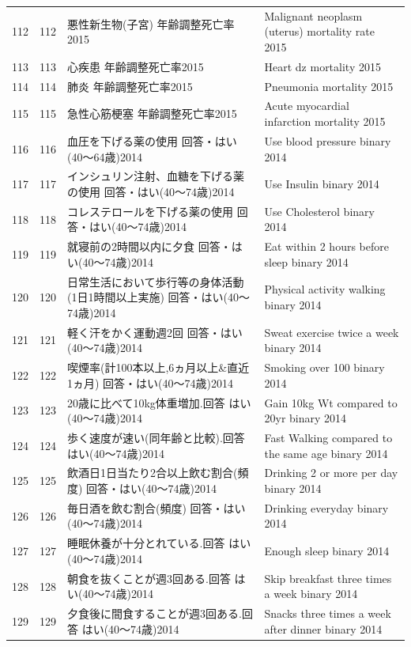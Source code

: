 \begin{table}[ht]
\begin{tabular}{rrll}
  112 & 112 & 悪性新生物(子宮) 年齢調整死亡率2015 & Malignant neoplasm (uterus) mortality rate 2015 \\ 
  113 & 113 & 心疾患 年齢調整死亡率2015 & Heart dz mortality 2015 \\ 
  114 & 114 & 肺炎 年齢調整死亡率2015 & Pneumonia mortality 2015 \\ 
  115 & 115 & 急性心筋梗塞 年齢調整死亡率2015 & Acute myocardial infarction mortality 2015 \\ 
  116 & 116 & 血圧を下げる薬の使用 回答・はい(40〜64歳)2014 & Use blood pressure binary 2014 \\ 
  117 & 117 & インシュリン注射、血糖を下げる薬の使用 回答・はい(40〜74歳)2014 & Use Insulin binary 2014 \\ 
  118 & 118 & コレステロールを下げる薬の使用 回答・はい(40〜74歳)2014 & Use Cholesterol binary 2014 \\ 
  119 & 119 & 就寝前の2時間以内に夕食 回答・はい(40〜74歳)2014 & Eat within 2 hours before sleep binary 2014 \\ 
  120 & 120 & 日常生活において歩行等の身体活動(1日1時間以上実施) 回答・はい(40〜74歳)2014 & Physical activity walking binary 2014 \\ 
  121 & 121 & 軽く汗をかく運動週2回 回答・はい(40〜74歳)2014 & Sweat exercise twice a week binary 2014 \\ 
  122 & 122 & 喫煙率(計100本以上,6ヵ月以上\&直近1ヵ月) 回答・はい(40〜74歳)2014 & Smoking over 100 binary 2014 \\ 
  123 & 123 & 20歳に比べて10kg体重増加.回答 はい(40〜74歳)2014 & Gain 10kg Wt compared to 20yr binary 2014 \\ 
  124 & 124 & 歩く速度が速い(同年齢と比較).回答 はい(40〜74歳)2014 & Fast Walking compared to the same age binary 2014 \\ 
  125 & 125 & 飲酒日1日当たり2合以上飲む割合(頻度) 回答・はい(40〜74歳)2014 & Drinking 2 or more per day binary 2014 \\ 
  126 & 126 & 毎日酒を飲む割合(頻度) 回答・はい(40〜74歳)2014 & Drinking everyday binary 2014 \\ 
  127 & 127 & 睡眠休養が十分とれている.回答 はい(40〜74歳)2014 & Enough sleep binary 2014 \\ 
  128 & 128 & 朝食を抜くことが週3回ある.回答 はい(40〜74歳)2014 & Skip breakfast three times a week binary 2014 \\ 
  129 & 129 & 夕食後に間食することが週3回ある.回答 はい(40〜74歳)2014 & Snacks three times a week after dinner binary 2014 \\ 

\end{tabular}
\end{table}
